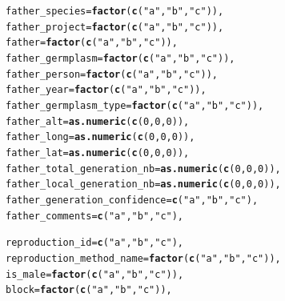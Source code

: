 \documentclass{article}\usepackage[]{graphicx}\usepackage[]{color}
\makeatletter
\newcommand{\hlnum}[1]{\textcolor[rgb]{0.686,0.059,0.569}{#1}}%
\newcommand{\hlstr}[1]{\textcolor[rgb]{0.192,0.494,0.8}{#1}}%
\newcommand{\hlstd}[1]{\textcolor[rgb]{0.345,0.345,0.345}{#1}}%
\newcommand{\hlkwc}[1]{\textcolor[rgb]{0.333,0.667,0.333}{#1}}%
\newcommand{\hlkwd}[1]{\textcolor[rgb]{0.737,0.353,0.396}{\textbf{#1}}}%
\newenvironment{kframe}{%
 \def\at@end@of@kframe{}%
 \ifinner\ifhmode%
  \def\at@end@of@kframe{\end{minipage}}%
  \begin{minipage}{\columnwidth}%
 \fi\fi%
 \def\FrameCommand##1{\hskip\@totalleftmargin \hskip-\fboxsep
 \colorbox{shadecolor}{##1}\hskip-\fboxsep
     \hskip-\linewidth \hskip-\@totalleftmargin \hskip\columnwidth}%
 \MakeFramed {\advance\hsize-\width
   \@totalleftmargin\z@ \linewidth\hsize
   \@setminipage}}%
 {\par\unskip\endMakeFramed%
 \at@end@of@kframe}
\newenvironment{knitrout}{}{} %
\makeatother
\begin{document}
\begin{appendices}
\begin{knitrout}
\begin{kframe}
\begin{alltt}
        \hlkwc{father_species} \hlstd{=} \hlkwd{factor}\hlstd{(}\hlkwd{c}\hlstd{(}\hlstr{"a"}\hlstd{,} \hlstr{"b"}\hlstd{,} \hlstr{"c"}\hlstd{)),}
        \hlkwc{father_project} \hlstd{=} \hlkwd{factor}\hlstd{(}\hlkwd{c}\hlstd{(}\hlstr{"a"}\hlstd{,} \hlstr{"b"}\hlstd{,} \hlstr{"c"}\hlstd{)),}
        \hlkwc{father} \hlstd{=} \hlkwd{factor}\hlstd{(}\hlkwd{c}\hlstd{(}\hlstr{"a"}\hlstd{,} \hlstr{"b"}\hlstd{,} \hlstr{"c"}\hlstd{)),}
        \hlkwc{father_germplasm} \hlstd{=} \hlkwd{factor}\hlstd{(}\hlkwd{c}\hlstd{(}\hlstr{"a"}\hlstd{,} \hlstr{"b"}\hlstd{,} \hlstr{"c"}\hlstd{)),}
        \hlkwc{father_person} \hlstd{=} \hlkwd{factor}\hlstd{(}\hlkwd{c}\hlstd{(}\hlstr{"a"}\hlstd{,} \hlstr{"b"}\hlstd{,} \hlstr{"c"}\hlstd{)),}
        \hlkwc{father_year} \hlstd{=} \hlkwd{factor}\hlstd{(}\hlkwd{c}\hlstd{(}\hlstr{"a"}\hlstd{,} \hlstr{"b"}\hlstd{,} \hlstr{"c"}\hlstd{)),}
        \hlkwc{father_germplasm_type} \hlstd{=} \hlkwd{factor}\hlstd{(}\hlkwd{c}\hlstd{(}\hlstr{"a"}\hlstd{,} \hlstr{"b"}\hlstd{,} \hlstr{"c"}\hlstd{)),}
        \hlkwc{father_alt} \hlstd{=} \hlkwd{as.numeric}\hlstd{(}\hlkwd{c}\hlstd{(}\hlnum{0}\hlstd{,} \hlnum{0}\hlstd{,} \hlnum{0}\hlstd{)),}
        \hlkwc{father_long} \hlstd{=} \hlkwd{as.numeric}\hlstd{(}\hlkwd{c}\hlstd{(}\hlnum{0}\hlstd{,} \hlnum{0}\hlstd{,} \hlnum{0}\hlstd{)),}
        \hlkwc{father_lat} \hlstd{=} \hlkwd{as.numeric}\hlstd{(}\hlkwd{c}\hlstd{(}\hlnum{0}\hlstd{,} \hlnum{0}\hlstd{,} \hlnum{0}\hlstd{)),}
        \hlkwc{father_total_generation_nb} \hlstd{=} \hlkwd{as.numeric}\hlstd{(}\hlkwd{c}\hlstd{(}\hlnum{0}\hlstd{,} \hlnum{0}\hlstd{,} \hlnum{0}\hlstd{)),}
        \hlkwc{father_local_generation_nb} \hlstd{=} \hlkwd{as.numeric}\hlstd{(}\hlkwd{c}\hlstd{(}\hlnum{0}\hlstd{,} \hlnum{0}\hlstd{,} \hlnum{0}\hlstd{)),}
        \hlkwc{father_generation_confidence} \hlstd{=} \hlkwd{c}\hlstd{(}\hlstr{"a"}\hlstd{,} \hlstr{"b"}\hlstd{,} \hlstr{"c"}\hlstd{),}
        \hlkwc{father_comments} \hlstd{=} \hlkwd{c}\hlstd{(}\hlstr{"a"}\hlstd{,} \hlstr{"b"}\hlstd{,} \hlstr{"c"}\hlstd{),}

        \hlkwc{reproduction_id} \hlstd{=} \hlkwd{c}\hlstd{(}\hlstr{"a"}\hlstd{,} \hlstr{"b"}\hlstd{,} \hlstr{"c"}\hlstd{),}
        \hlkwc{reproduction_method_name} \hlstd{=} \hlkwd{factor}\hlstd{(}\hlkwd{c}\hlstd{(}\hlstr{"a"}\hlstd{,} \hlstr{"b"}\hlstd{,} \hlstr{"c"}\hlstd{)),}
        \hlkwc{is_male} \hlstd{=} \hlkwd{factor}\hlstd{(}\hlkwd{c}\hlstd{(}\hlstr{"a"}\hlstd{,} \hlstr{"b"}\hlstd{,} \hlstr{"c"}\hlstd{)),}
        \hlkwc{block} \hlstd{=} \hlkwd{factor}\hlstd{(}\hlkwd{c}\hlstd{(}\hlstr{"a"}\hlstd{,} \hlstr{"b"}\hlstd{,} \hlstr{"c"}\hlstd{)),}


\end{alltt}
\end{kframe}
\end{knitrout}
\end{appendices}
\end{document}
